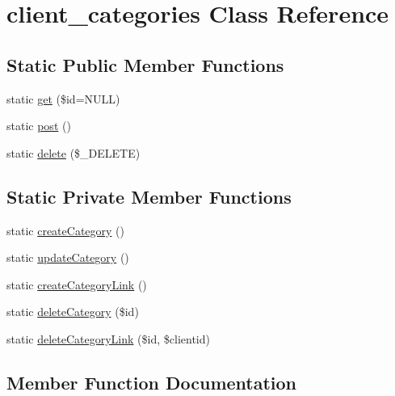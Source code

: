 \hypertarget{a00016}{}\section{client\+\_\+categories Class Reference}
\label{a00016}
\subsection*{Static Public Member Functions}
\begin{DoxyCompactItemize}
\item 
static \hyperlink{a00016_ae04fdce0d6e979f026b6fc56bd634a40}{get} (\$id=N\+U\+L\+L)
\item 
static \hyperlink{a00016_a68f2acd1041d57bf8faf2da612e202a8}{post} ()
\item 
static \hyperlink{a00016_a598da63ff0199f442adaa4dfb0fe1447}{delete} (\$\+\_\+\+D\+E\+L\+E\+T\+E)
\end{DoxyCompactItemize}
\subsection*{Static Private Member Functions}
\begin{DoxyCompactItemize}
\item 
static \hyperlink{a00016_a30acba254adb7feea7d8f75c373850ff}{create\+Category} ()
\item 
static \hyperlink{a00016_ae21335ac166500706a659252ac5be1af}{update\+Category} ()
\item 
static \hyperlink{a00016_a31253de0c3367455cb963c6e4ee6171d}{create\+Category\+Link} ()
\item 
static \hyperlink{a00016_af22055a5098ca5c58d1e4f29629c049b}{delete\+Category} (\$id)
\item 
static \hyperlink{a00016_aa66700a84026a52b1b29da3c788ad42a}{delete\+Category\+Link} (\$id, \$clientid)
\end{DoxyCompactItemize}


\subsection{Member Function Documentation}
\hypertarget{a00016_ae04fdce0d6e979f026b6fc56bd634a40}{}
